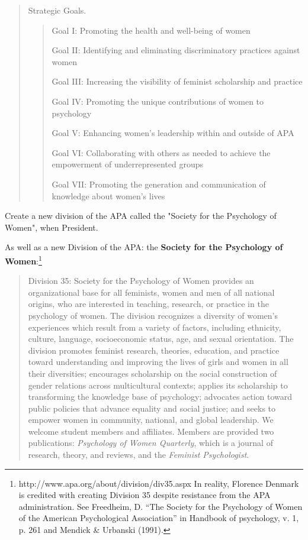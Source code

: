 \begin{refsection}
\begin{quote}
Strategic Goals. 

\begin{quote}

Goal I: Promoting the health and well-being of women

Goal II: Identifying and eliminating discriminatory practices against women

Goal III: Increasing the visibility of feminist scholarship and practice

Goal IV: Promoting the unique contributions of women to psychology

Goal V: Enhancing women’s leadership within and outside of APA

Goal VI: Collaborating with others as needed to achieve the empowerment of underrepresented groups

Goal VII: Promoting the generation and communication of knowledge about women’s lives
\end{quote}
\end{quote}

\begin{proposal}[Anastasi]\label{proposal:anastasiB}
Create a  new division of the APA called the "Society for the Psychology of Women", when President.
\end{proposal}

As well as a new Division of the APA: the \textbf{Society for the Psychology of Women}:\footnote{http:\slash \slash www.apa.org\slash about\slash division\slash div35.aspx In reality, Florence Denmark is credited with creating Division 35 despite resistance from the APA administration. See Freedheim, D. “The Society for the Psychology of Women of the American Psychological Association” in Handbook of psychology, v. 1, p. 261 and Mendick \& Urbanski (1991).}

\begin{quote}

Division 35: Society for the Psychology of Women provides an organizational base for all feminists, women and men of all national origins, who are interested in teaching, research, or practice in the psychology of women. The division recognizes a diversity of women's experiences which result from a variety of factors, including ethnicity, culture, language, socioeconomic status, age, and sexual orientation. The division promotes feminist research, theories, education, and practice toward understanding and improving the lives of girls and women in all their diversities; encourages scholarship on the social construction of gender relations across multicultural contexts; applies its scholarship to transforming the knowledge base of psychology; advocates action toward public policies that advance equality and social justice; and seeks to empower women in community, national, and global leadership. We welcome student members and affiliates. Members are provided two publications: \emph{Psychology of Women Quarterly}, which is a journal of research, theory, and reviews, and the \emph{Feminist Psychologist}.
\end{quote}


\end{refsection}
